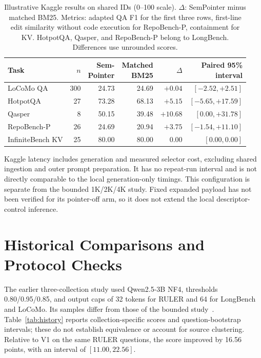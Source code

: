 \documentclass[pdflatex,sn-mathphys-num]{sn-jnl}
\begin{document}
\begingroup
\renewcommand{\tablebodyfont}{\normalsize}
\renewcommand{\tablecaptionfont}{\small}
\begin{table}[!htbp]\centering
\caption{Illustrative Kaggle results on shared IDs (0--100 scale). $\Delta$: SemPointer minus matched BM25. Metrics: adapted QA F1 for the first three rows, first-line edit similarity without code execution for RepoBench-P, containment for KV. HotpotQA, Qasper, and RepoBench-P belong to LongBench. Differences use unrounded scores.}\label{tab:kaggle-quality}
\begin{tabular*}{\linewidth}{@{\extracolsep{\fill}}lrrrrr@{}}\toprule
Task & $n$ & \shortstack{Sem-\\Pointer} & \shortstack{Matched\\BM25} & $\Delta$ & \shortstack{Paired 95\%\\interval} \\
\midrule
LoCoMo QA & 300 & 24.73 & 24.69 & $+0.04$ & $[-2.52,+2.51]$ \\
HotpotQA & 27 & 73.28 & 68.13 & $+5.15$ & $[-5.65,+17.59]$ \\
Qasper & 8 & 50.15 & 39.48 & $+10.68$ & $[0.00,+31.78]$ \\
RepoBench-P & 26 & 24.69 & 20.94 & $+3.75$ & $[-1.54,+11.10]$ \\
InfiniteBench KV & 25 & 80.00 & 80.00 & $0.00$ & $[0.00,0.00]$ \\
\bottomrule\end{tabular*}\end{table}
\endgroup

Kaggle latency includes generation and measured selector cost, excluding shared ingestion and outer prompt preparation. It has no repeat-run interval and is not directly comparable to the local generation-only timings. This configuration is separate from the bounded 1K/2K/4K study. Fixed expanded payload has not been verified for its pointer-off arm, so it does not extend the local descriptor-control inference.
\section{Historical Comparisons and Protocol Checks}
The earlier three-collection study used Qwen2.5-3B NF4, thresholds 0.80/0.95/0.85, and output caps of 32 tokens for RULER and 64 for LongBench and LoCoMo. Its samples differ from those of the bounded study~\cite{qwen2025qwen25}. Table~\ref{tab:history} reports collection-specific scores and question-bootstrap intervals; these do not establish equivalence or account for source clustering. Relative to V1 on the same RULER questions, the score improved by 16.56 points, with an interval of $[11.00,22.56]$.
\end{document}
